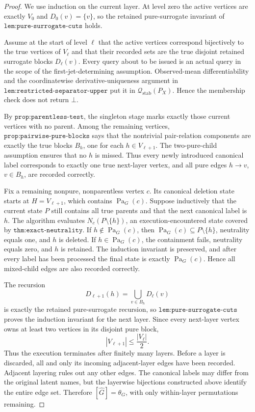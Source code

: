 \documentclass{article}
\begin{document}
\begin{proof}
We use induction on the current layer.  At level zero the active vertices are exactly \(V_0\) and \(D_0(v)=\{v\}\), so the retained pure-surrogate invariant of \(\texttt{lem:pure-surrogate-cuts}\) holds.

Assume at the start of level \(\ell\) that the active vertices correspond bijectively to the true vertices of \(V_\ell\) and that their recorded sets are the true disjoint retained surrogate blocks \(D_\ell(v)\).  Every query about to be issued is an actual query in the scope of the first-jet-determining assumption.  Observed-mean differentiability and the coordinatewise derivative-uniqueness argument in \(\texttt{lem:restricted-separator-upper}\) put it in \(\mathcal Q_{\mathrm{stab}}(P_X)\).  Hence the membership check does not return \(\bot\).

By \(\texttt{prop:parentless-test}\), the singleton stage marks exactly those current vertices with no parent.  Among the remaining vertices, \(\texttt{prop:pairwise-pure-blocks}\) says that the nontrivial pair-relation components are exactly the true blocks \(B_h\), one for each \(h\in V_{\ell+1}\).  The two-pure-child assumption ensures that no \(h\) is missed.  Thus every newly introduced canonical label corresponds to exactly one true next-layer vertex, and all pure edges \(h\to v\), \(v\in B_h\), are recorded correctly.

Fix a remaining nonpure, nonparentless vertex \(c\).  Its canonical deletion state starts at \(H=V_{\ell+1}\), which contains \(\operatorname{Pa}_G(c)\).  Suppose inductively that the current state \(P\) still contains all true parents and that the next canonical label is \(h\).  The algorithm evaluates \(N_c(P\setminus\{h\})\), an execution-encountered state covered by \(\texttt{thm:exact-neutrality}\).  If \(h\notin\operatorname{Pa}_G(c)\), then \(\operatorname{Pa}_G(c)\subseteq P\setminus\{h\}\), neutrality equals one, and \(h\) is deleted.  If \(h\in\operatorname{Pa}_G(c)\), the containment fails, neutrality equals zero, and \(h\) is retained.  The induction invariant is preserved, and after every label has been processed the final state is exactly \(\operatorname{Pa}_G(c)\).  Hence all mixed-child edges are also recorded correctly.

The recursion
\[
 D_{\ell+1}(h)=\bigcup_{v\in B_h}D_\ell(v)
\]
is exactly the retained pure-surrogate recursion, so \(\texttt{lem:pure-surrogate-cuts}\) proves the induction invariant for the next layer.  Since every next-layer vertex owns at least two vertices in its disjoint pure block,
\[
 |V_{\ell+1}|\leq \frac{|V_\ell|}{2}. \tag{1}
\]
Thus the execution terminates after finitely many layers.  Before a layer is discarded, all and only its incoming adjacent-layer edges have been recorded.  Adjacent layering rules out any other edges.  The canonical labels may differ from the original latent names, but the layerwise bijections constructed above identify the entire edge set.  Therefore \([\widehat G]=\theta_G\), with only within-layer permutations remaining.


\end{proof}
\end{document}
